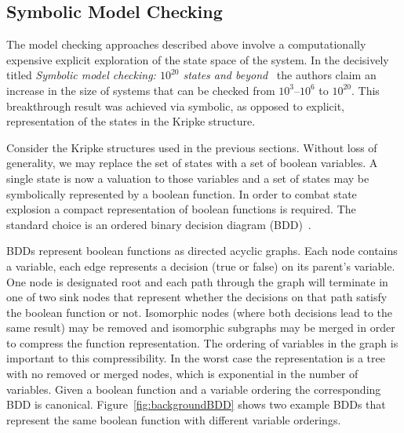 \subsection{Symbolic Model Checking}

The model checking approaches described above involve a computationally expensive explicit exploration of the state space of the system. In the decisively titled \emph{Symbolic model checking: $10^{20}$ states and beyond}~\cite{Burch90} the authors claim an increase in the size of systems that can be checked from $10^3$--$10^6$ to $10^{20}$. This breakthrough result was achieved via symbolic, as opposed to explicit, representation of the states in the Kripke structure.

Consider the Kripke structures used in the previous sections. Without loss of generality, we may replace the set of states with a set of boolean variables. A single state is now a valuation to those variables and a set of states may be symbolically represented by a boolean function. In order to combat state explosion a compact representation of boolean functions is required. The standard choice is an ordered binary decision diagram (BDD)~\cite{Bryant86}.

BDDs represent boolean functions as directed acyclic graphs. Each node contains a variable, each edge represents a decision (true or false) on its parent's variable. One node is designated root and each path through the graph will terminate in one of two sink nodes that represent whether the decisions on that path satisfy the boolean function or not. Isomorphic nodes (where both decisions lead to the same result) may be removed and isomorphic subgraphs may be merged in order to compress the function representation. The ordering of variables in the graph is important to this compressibility. In the worst case the representation is a tree with no removed or merged nodes, which is exponential in the number of variables. Given a boolean function and a variable ordering the corresponding BDD is canonical. Figure~\ref{fig:backgroundBDD} shows two example BDDs that represent the same boolean function with different variable orderings.

